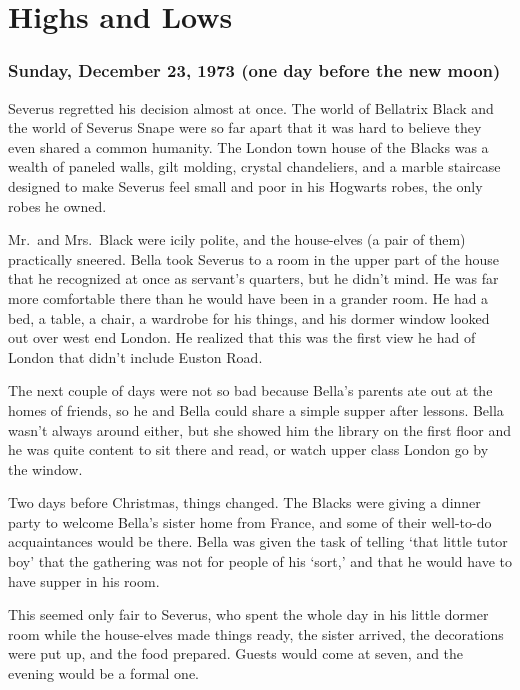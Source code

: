 
\chapter{Highs and Lows}

\subsection{Sunday, December 23, 1973 (one day before the new moon)}

Severus regretted his decision almost at once. The world of Bellatrix Black and the world of Severus Snape were so far apart that it was hard to believe they even shared a common humanity. The London town house of the Blacks was a wealth of paneled walls, gilt molding, crystal chandeliers, and a marble staircase designed to make Severus feel small and poor in his Hogwarts robes, the only robes he owned.

Mr.~and Mrs.~Black were icily polite, and the house-elves (a pair of them) practically sneered. Bella took Severus to a room in the upper part of the house that he recognized at once as servant's quarters, but he didn't mind. He was far more comfortable there than he would have been in a grander room. He had a bed, a table, a chair, a wardrobe for his things, and his dormer window looked out over west end London. He realized that this was the first view he had of London that didn't include Euston Road.

The next couple of days were not so bad because Bella's parents ate out at the homes of friends, so he and Bella could share a simple supper after lessons. Bella wasn't always around either, but she showed him the library on the first floor and he was quite content to sit there and read, or watch upper class London go by the window.

Two days before Christmas, things changed. The Blacks were giving a dinner party to welcome Bella's sister home from France, and some of their well-to-do acquaintances would be there. Bella was given the task of telling `that little tutor boy' that the gathering was not for people of his `sort,' and that he would have to have supper in his room.

This seemed only fair to Severus, who spent the whole day in his little dormer room while the house-elves made things ready, the sister arrived, the decorations were put up, and the food prepared. Guests would come at seven, and the evening would be a formal one.

